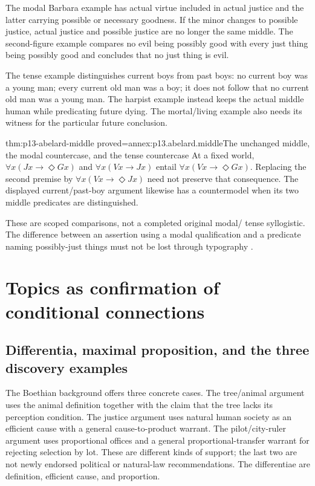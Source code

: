 The modal Barbara example has actual virtue included in actual
justice and the latter carrying possible or necessary goodness.
If the minor changes to possible justice, actual justice and
possible justice are no longer the same middle.
The second-figure example compares no evil being possibly good
with every just thing being possibly good and concludes that
no just thing is evil.

The tense example distinguishes current boys from past boys:
no current boy was a young man; every current old man was a boy;
it does not follow that no current old man was a young man.
The harpist example instead keeps the actual middle human
while predicating future dying. The mortal/living example
also needs its witness for the particular future conclusion.

\begin{hblemma}{thm:p13-abelard-middle}
 {proved=annex:p13.abelard.middle}{The unchanged middle, the modal countercase, and the tense countercase}
At a fixed world, \(\forall x(Jx\to\Diamond Gx)\) and
\(\forall x(Vx\to Jx)\) entail
\(\forall x(Vx\to\Diamond Gx)\).
Replacing the second premise by
\(\forall x(Vx\to\Diamond Jx)\) need not preserve that consequence.
The displayed current/past-boy argument likewise has a
countermodel when its two middle predicates are distinguished.
\end{hblemma}

These are scoped comparisons, not a completed original modal/
tense syllogistic. The difference between an assertion using
a modal qualification and a predicate naming possibly-just
things must not be lost through typography
\cite[pp.~119--121]{Wilks2007FordhamAbelard}.

\section{Topics as confirmation of conditional connections}
\label{sec:p13-abelard-topics}

\subsection{Differentia, maximal proposition, and the three discovery examples}

The Boethian background offers three concrete cases.
The tree/animal argument uses the animal definition together
with the claim that the tree lacks its perception condition.
The justice argument uses natural human society as an efficient
cause with a general cause-to-product warrant.
The pilot/city-ruler argument uses proportional offices and
a general proportional-transfer warrant for rejecting selection
by lot. These are different kinds of support; the last two
are not newly endorsed political or natural-law recommendations.
The differentiae are definition, efficient cause, and proportion.

